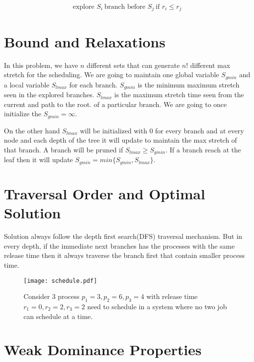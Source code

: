 \documentclass[11pt, conference, onecolumn]{IEEEtran}
\begin{document}
\begin{equation*}
\begin{array}{l}
\text{explore }S_i \ \text{branch before } S_j\ \text{if }  r_{i}\leq r_{j} 
\end{array}
\end{equation*}

\section{Bound and Relaxations}
In this problem, we have $n$ different sets that can generate $n!$ different max stretch for the scheduling. We are going to maintain 
one global variable $S_{gmin}$ and a local variable $S_{lmax}$ for each branch.
$S_{gmin}$ is the minimum maximum stretch seen in the explored branches. $S_{lmax}$ is the maximum stretch time seen from the current and path to the root.
of a particular branch.
We are going to once initialize the $S_{gmin} = \infty$.

On the other hand $S_{lmax}$ will be initialized with $0$ for every branch and at every node and each depth of the tree it will update to maintain the 
max stretch of that branch. A branch will be pruned if $S_{lmax}\geq S_{gmin}$.  If a branch reach at the leaf then it will update 
$S_{gmin} = min\{S_{gmin}, S_{lmax}\}$. 

\section{Traversal Order and Optimal Solution}
Solution always follow the depth first search(DFS) traversal mechanism. But in every depth, if the immediate next branches has the processes 
with the same release time then it always traverse the branch first that contain smaller process time. 
\begin{figure}
\centering
\texttt{[image: schedule.pdf]}
\caption{Consider 3 process $p_1=3,p_2=6,p_3=4$ with release time $r_1=0,r_2=2,r_3=2$ need to schedule in a system where no two job can schedule at  a time.}
\end{figure}
\section{Weak Dominance Properties}
\end{document}
